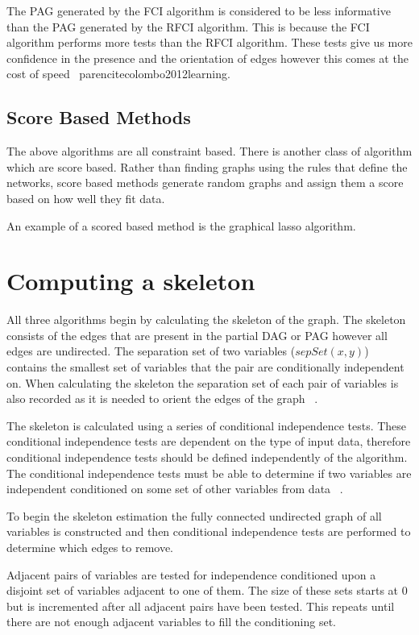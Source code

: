 \documentclass{UoYCSproject}
\begin{document}
The PAG generated by the FCI algorithm is considered to be less informative than the PAG generated by the RFCI algorithm. This is because the FCI algorithm performs more tests than the RFCI algorithm. These tests give us more confidence in the presence and the orientation of edges however this comes at the cost of speed ~parencite{colombo2012learning}.

\subsection{Score Based Methods}
The above algorithms are all constraint based. There is another class of algorithm which are score based. Rather than finding graphs using the rules that define the networks, score based methods generate random graphs and assign them a score based on how well they fit data.

An example of a scored based method is the graphical lasso algorithm. 

\section{Computing a skeleton}
All three algorithms begin by calculating the skeleton of the graph. The skeleton consists of the edges that are present in the partial DAG or PAG however all edges are undirected. The separation set of two variables ($sepSet(x,y)$) contains the smallest set of variables that the pair are conditionally independent on. When calculating the skeleton the separation set of each pair of variables is also recorded as it is needed to orient the edges of the graph ~\parencite{colombo2012learning, spirtes1991algorithm}.

The skeleton is calculated using a series of conditional independence tests. These conditional independence tests are dependent on the type of input data, therefore conditional independence tests should be defined independently of the algorithm. The conditional independence tests must be able to determine if two variables are independent conditioned on some set of other variables from data ~\parencite{spirtes1991algorithm}.

To begin the skeleton estimation the fully connected undirected graph of all variables is constructed and then conditional independence tests are performed to determine which edges to remove.

Adjacent pairs of variables are tested for independence conditioned upon a disjoint set of variables adjacent to one of them. The size of these sets starts at 0 but is incremented after all adjacent pairs have been tested. This repeats until there are not enough adjacent variables to fill the conditioning set.\\
\end{document}
